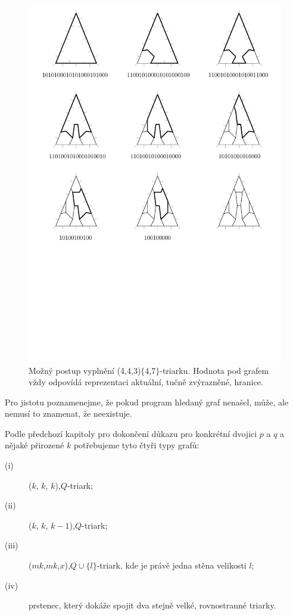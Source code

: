 \begin{figure}[h!]\centering
\includegraphics[width=\textwidth]{../img/reseni}
\caption{Možný postup vyplnění (4,4,3)$\lbrace$4,7$\rbrace$-triarku. Hodnota pod grafem vždy odpovídá reprezentaci aktuální, tučně zvýrazněné, hranice.}
\label{obr03:reseni}
\end{figure}

Pro jistotu poznamenejme, že pokud program hledaný graf nenašel, může, ale nemusí to znamenat, že neexistuje.

Podle předchozí kapitoly pro dokončení důkazu pro konkrétní dvojici $p$ a $q$ a nějaké přirozené $k$ potřebujeme tyto čtyři typy grafů:
\begin{description}
\item[(i)] ($k$, $k$, $k$),$Q$-triark;
\item[(ii)] ($k$, $k$, $k-1$),$Q$-triark;
\item[(iii)] ($mk$,$mk$,$x$),$Q\cup \lbrace l\rbrace$-triark, kde je právě jedna stěna velikosti $l$;
\item[(iv)] prstenec, který dokáže spojit dva stejně velké, rovnostranné triarky.
\end{description}


